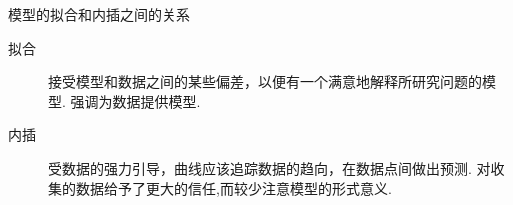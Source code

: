 \documentclass[mathserif]{beamer}
\begin{document}
\begin{frame}{模型的拟合和内插之间的关系}
  \begin{description}
  \item[拟合] 接受模型和数据之间的某些偏差，以便有一个满意地解释所研究问题的模型. 强调为数据提供模型.
  \item[内插] 受数据的强力引导，曲线应该追踪数据的趋向，在数据点间做出预测. 对收集的数据给予了更大的信任,而较少注意模型的形式意义.
  \end{description}

  \begin{figure}
    \centering
  \end{figure}
\end{frame}
\end{document}
